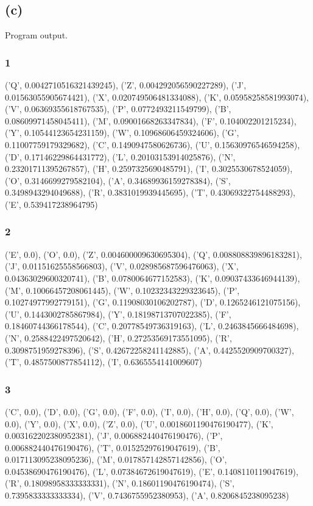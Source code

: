 \documentclass [11pt, a4paper, oneside] {article}
\begin{document}
\subsection *{(c)}
 
 

Program output. 
\subsubsection *{1}
('Q', 0.0042710516321439245), ('Z', 0.004292056590227289), ('J', 0.01563055905674421), ('X', 0.020749506481334088), ('K', 0.05958258581993074), ('V', 0.06369355618767535), ('P', 0.0772493211549799), ('B', 0.08609971458045411), ('M', 0.09001668263347834), ('F', 0.104002201215234), ('Y', 0.10544123654231159), ('W', 0.10968606459324606), ('G', 0.11007759179329682), ('C', 0.1490947580626736), ('U', 0.15630976546594258), ('D', 0.17146229864431772), ('L', 0.20103153914025876), ('N', 0.23201711395267857), ('H', 0.2597325690485791), ('I', 0.3025530678524059), ('O', 0.3146699279582104), ('A', 0.34689936159278384), ('S', 0.3498943294049688), ('R', 0.3831019939445695), ('T', 0.43069322754488293), ('E', 0.539417238964795)
\subsubsection *{2}
('E', 0.0), ('O', 0.0), ('Z', 0.004600009630695304), ('Q', 0.008808839896183281), ('J', 0.01151625558566803), ('V', 0.028985687596476063), ('X', 0.04363029600320741), ('B', 0.0780064677152583), ('K', 0.09037433646944139), ('M', 0.10066457208061445), ('W', 0.10232343229323645), ('P', 0.10274977992779151), ('G', 0.11908030106202787), ('D', 0.1265246121075156), ('U', 0.1443002785867984), ('Y', 0.18198713707022385), ('F', 0.18460744366178544), ('C', 0.20778549736319163), ('L', 0.2463845666484698), ('N', 0.2588422497520642), ('H', 0.27253569173551095), ('R', 0.3098751959278396), ('S', 0.42672258241142885), ('A', 0.4425520909700327), ('T', 0.4857500877854112), ('I', 0.6365554141009607)
\subsubsection *{3}
('C', 0.0), ('D', 0.0), ('G', 0.0), ('F', 0.0), ('I', 0.0), ('H', 0.0), ('Q', 0.0), ('W', 0.0), ('Y', 0.0), ('X', 0.0), ('Z', 0.0), ('U', 0.0018601190476190477), ('K', 0.003162202380952381), ('J', 0.006882440476190476), ('P', 0.006882440476190476), ('T', 0.01525297619047619), ('B', 0.017113095238095236), ('M', 0.017857142857142856), ('O', 0.04538690476190476), ('L', 0.07384672619047619), ('E', 0.1408110119047619), ('R', 0.18098958333333331), ('N', 0.18601190476190474), ('S', 0.7395833333333334), ('V', 0.7436755952380953), ('A', 0.8206845238095238)
\end{document}
